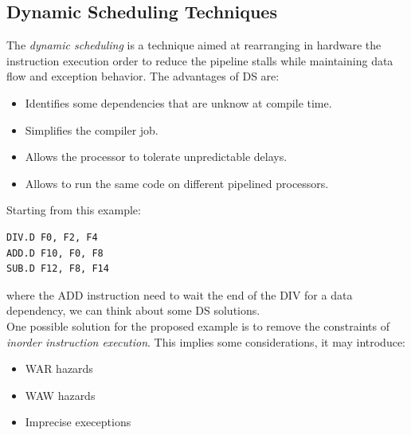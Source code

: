 \documentclass[12pt]{article}
\begin{document}
\subsection{Dynamic Scheduling Techniques}
The \textit{dynamic scheduling} is a technique aimed at rearranging in hardware the instruction execution order to reduce the pipeline stalls while maintaining data flow and exception behavior. The advantages of DS are:
\begin{itemize}
  \item Identifies some dependencies that are unknow at compile time.
  \item Simplifies the compiler job.
  \item Allows the processor to tolerate unpredictable delays.
  \item Allows to run the same code on different pipelined processors.
\end{itemize}
Starting from this example:
\begin{lstlisting}
DIV.D F0, F2, F4
ADD.D F10, F0, F8
SUB.D F12, F8, F14
\end{lstlisting}
where the ADD instruction need to wait the end of the DIV for a data dependency, we can think about some DS solutions.\\
One possible solution for the proposed example is to remove the constraints of \textit{inorder instruction execution}. This implies some considerations, it may introduce:
\begin{itemize}
  \item WAR hazards
  \item WAW hazards
  \item Imprecise execeptions
\end{itemize}
\end{document}
